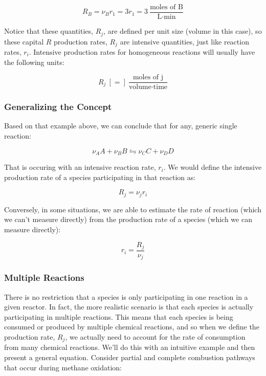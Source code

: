 \documentclass[11pt]{article}
\begin{document}
\[R_B = \nu_B r_1 = 3r_1 = 3 \ \frac{\text{moles \ of \ B}}{\text{L} \cdot \text{min}}\]

Notice that these quantities, \(R_j\), are defined per unit size (volume
in this case), so these capital \(R\) production rates, \(R_j\) are
intensive quantities, just like reaction rates, \(r_i\). Intensive
production rates for homogeneous reactions will usually have the
following units:

\[R_j \ [=] \ \frac{\text{moles of j}}{\text{volume} \cdot \text{time}}\]

\hypertarget{generalizing-the-concept}{%
\subsubsection{Generalizing the
Concept}\label{generalizing-the-concept}}

Based on that example above, we can conclude that for any, generic
single reaction:

\[\nu_A A + \nu_B B \leftrightharpoons \nu_C C + \nu_D D\]

That is occuring with an intensive reaction rate, \(r_i\). We would
define the intensive production rate of a species participating in that
reaction as:

\[R_j = \nu_j r_i\]

Conversely, in some situations, we are able to estimate the rate of
reaction (which we can't measure directly) from the production rate of a
species (which we can measure directly):

\[r_i = \frac{R_j}{\nu_j}\]

    \hypertarget{multiple-reactions}{%
\subsubsection{Multiple Reactions}\label{multiple-reactions}}

There is no restriction that a species is only participating in one
reaction in a given reactor. In fact, the more realistic scenario is
that each species is actually participating in multiple reactions. This
means that each species is being consumed or produced by multiple
chemical reactions, and so when we define the production rate, \(R_j\),
we actually need to account for the rate of consumption from many
chemical reactions. We'll do this with an intuitive example and then
present a general equation. Consider partial and complete combustion
pathways that occur during methane oxidation:
\end{document}
